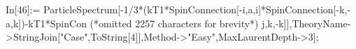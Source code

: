 In[46]:= ParticleSpectrum[-1/3*(kT1*SpinConnection[-i,a,i]*SpinConnection[-k,-a,k])-kT1*SpinCon (*omitted 2257 characters for brevity*) j,k,-k]],TheoryName->StringJoin["Case",ToString[4]],Method->"Easy",MaxLaurentDepth->3];